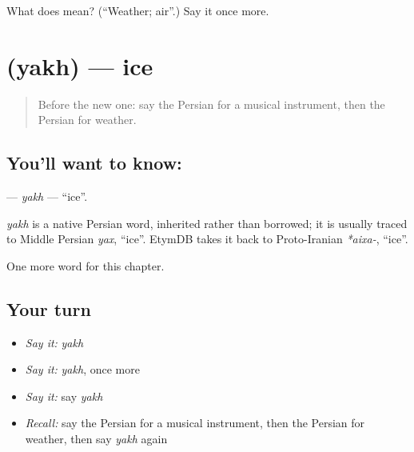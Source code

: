 \begin{tcolorbox}[breakable,colback=teal!4,colframe=teal!35!black,title={Before you move on}]
What does  mean? (\textquotedblleft{}Weather; air\textquotedblright{}.) Say it once more.
\end{tcolorbox}
\section[\texorpdfstring{\fa{یخ} (yakh)}{یخ (yakh)}]{ (yakh) — ice}

\label{lesson:FA-C208-yakh}



\begin{quote}
Before the new one: say the Persian for a musical instrument, then the Persian for weather.
\end{quote}

\subsection*{You'll want to know: }
\textbf{} — \emph{yakh} — \textquotedblleft{}ice\textquotedblright{}.

\begin{cousinweb}
\emph{yakh} is a native Persian word, inherited rather than borrowed; it is usually traced to Middle Persian \emph{yax}, \textquotedblleft{}ice\textquotedblright{}. EtymDB takes it back to Proto-Iranian \emph{*aixa-}, \textquotedblleft{}ice\textquotedblright{}.
\end{cousinweb}

\begin{grammarlens}[title={What you've built}]
One more word for this chapter.
\end{grammarlens}

\subsection*{Your turn}
\begin{itemize}
\raggedright
  \item \emph{Say it:} \emph{yakh}
  \item \emph{Say it:} \emph{yakh}, once more
  \item \emph{Say it:} say \emph{yakh}
  \item \emph{Recall:} say the Persian for a musical instrument, then the Persian for weather, then say \emph{yakh} again
\end{itemize}


